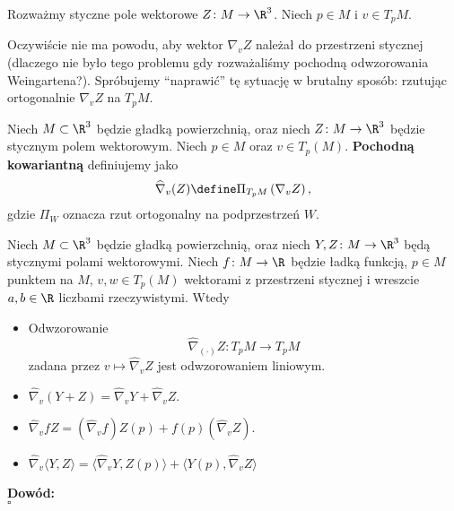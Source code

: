 \begin{frame}
 Rozważmy styczne pole wektorowe $Z\colon M\to \R^3$. Niech $p\in M$ i $v\in T_p M$. 

\pause Oczywiście nie ma powodu, aby wektor $\nabla_v Z$ należał do przestrzeni stycznej (dlaczego nie było tego problemu gdy rozważaliśmy pochodną odwzorowania Weingartena?). \pause Spróbujemy ``naprawić'' tę sytuację w brutalny sposób: rzutując ortogonalnie $\nabla_v Z$ na $T_p M$. %

\pause
 \begin{definicja}
 Niech $M\subset \R^3$ będzie gładką powierzchnią, oraz niech $Z\colon M\to \R^3$ będzie stycznym polem wektorowym. Niech $p\in M$ oraz $v\in T_p(M)$. \textbf{Pochodną kowariantną} definiujemy jako
 \[\widehat\nabla_v(Z)\define\Pi_{T_pM}\left(\nabla_vZ\right),\]gdzie $\Pi_W$ oznacza rzut ortogonalny na podprzestrzeń $W$.
 \end{definicja}
 \end{frame}
\begin{frame}

\begin{lemat}
  Niech $M\subset \R^3$ będzie gładką powierzchnią, oraz niech $Y, Z\colon M\to \R^3$ będą stycznymi polami wektorowymi. Niech $f\colon M\to \R$ będzie ładką funkcją, $p\in M$ punktem na $M$, $v,w\in T_p(M)$ wektorami z przestrzeni stycznej i wreszcie $a,b\in \R$ liczbami rzeczywistymi. Wtedy
 \begin{itemize}
  \item Odwzorowanie \[\widehat{\nabla}_{(\cdot)}Z\colon T_pM\to T_pM\] zadana przez $v\mapsto \widehat{\nabla}_vZ$ jest odwzorowaniem liniowym.
  \item $\widehat{\nabla}_v(Y+Z)=\widehat{\nabla}_vY+\widehat{\nabla}_v Z$.
  \item $\widehat{\nabla}_vfZ=(\widehat{\nabla}_v f)Z(p)+f(p)(\widehat{\nabla}_vZ)$.
 \item $\widehat{\nabla}_v\langle Y,Z\rangle=\langle\widehat{\nabla}_v Y, Z(p)\rangle+\langle Y(p),\widehat{\nabla}_v Z\rangle$
\end{itemize}
\end{lemat}

\pause \textcolor{ared}{\textbf{Dowód:}}\\
\hfill $\square$
\end{frame}
